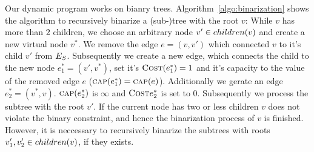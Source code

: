 \newcommand{\NodesToProcess}{\ensuremath{\textsc{nodesToProcess}}}
\begin{algorithm}[tbhp]
\DontPrintSemicolon %
\SetAlgoNoEnd
\KwIn{$\SubstrateNode \in \SubstrateNodes$}
\vspace{6pt}

\caption{$binarize(\SubstrateNode \in \SubstrateNodes)$}
\label{algo:binarization}
\end{algorithm}
\vspace{-1.5em}

Our dynamic program works on bianry trees. Algorithm~\ref{algo:binarization} 
shows the algorithm to recursively binarize a (sub-)tree with the root $v$:
While $v$ has more than 
$2$ children, we choose an arbitrary node $v' \in children(v)$ 
and create a new virtual node $v^*$. We remove the edge $e = (v, v')$ which 
connected $v$ to it's child $v'$ from $E_S$. Subsequently we create 
a new edge, which connects the 
child to the new node $e^*_1 = (v', v^*)$, set it's 
$\textsc{Cost}(e^*_1) = 1$ and it's capacity to the value of the removed edge $e$ 
($\textsc{cap}(e^*_1) = \textsc{cap}(e)$). Additionally we gerate an edge $e^*_2 = 
(v^*, v)$. $\textsc{cap}(e^*_2)$ is $\infty$ and $\textsc{Cost}{e^*_2}$ is set to $0$.
Subsequently we process the subtree with the root $v'$. If the current node has 
two or less children $v$ does not violate the binary constraint, and hence the 
binarization process of $v$ is finished. However, it is neccessary to 
recursively binarize the subtrees with roots $v'_1, v'_2 \in children(v)$, if 
they exists.

